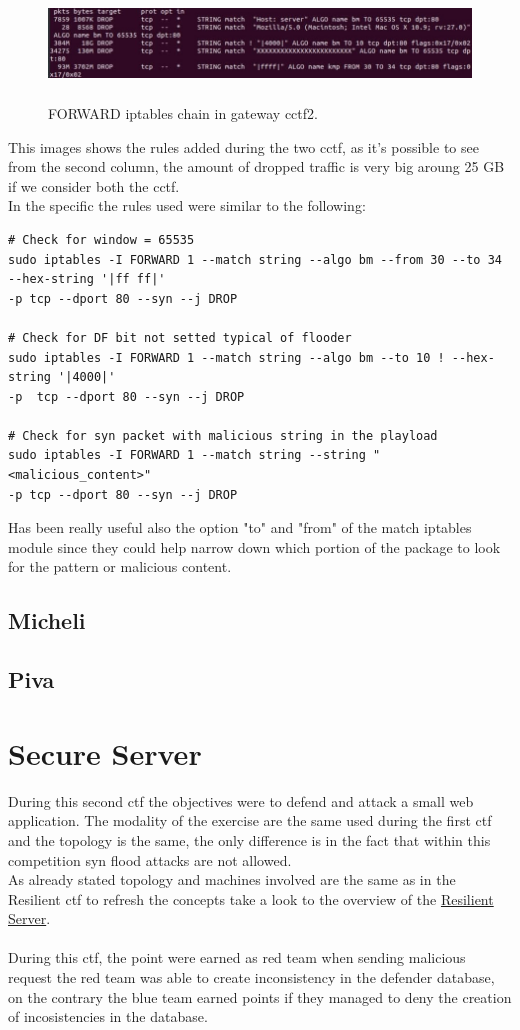 \documentclass[14pt]{article}
\begin{document}
\begin{figure}[!h]
	\centering
	\includegraphics[width=20cm,height=3cm]{iptables_cctf_2}
	\caption{FORWARD iptables chain in gateway cctf2.}
\end{figure}
This images shows the rules added during the two cctf, as it's possible to see from the second column, the amount of dropped traffic is very big aroung 25 GB if we consider both the cctf. 
\\
In the specific the rules used were similar to the following:
\begin{Verbatim}
# Check for window = 65535
sudo iptables -I FORWARD 1 --match string --algo bm --from 30 --to 34 --hex-string '|ff ff|' 
-p tcp --dport 80 --syn --j DROP 

# Check for DF bit not setted typical of flooder
sudo iptables -I FORWARD 1 --match string --algo bm --to 10 ! --hex-string '|4000|' 
-p  tcp --dport 80 --syn --j DROP 

# Check for syn packet with malicious string in the playload
sudo iptables -I FORWARD 1 --match string --string "<malicious_content>" 
-p tcp --dport 80 --syn --j DROP
\end{Verbatim}

Has been really useful also the option "to" and "from" of the match iptables module since 
they could help narrow down which portion of the package to look for the pattern or malicious content.

\subsection{Micheli}

\subsection{Piva}

\section{Secure Server}
During this second ctf the objectives were to defend and attack a small web application. The modality of the exercise are the same used during the first ctf and the topology is the same, the only difference is in the fact that within this competition syn flood attacks are not allowed.
\\
As already stated topology and machines involved are the same as in the Resilient ctf to refresh the concepts take a look to the overview of the \hyperref[sec:TopologyExaplanation]{Resilient Server}. 
\\
\\
During this ctf, the point were earned as red team when sending malicious request the red team was able to create inconsistency in the defender database, on the contrary the blue team earned points if they managed to deny the creation of incosistencies in the database. 
\end{document}
